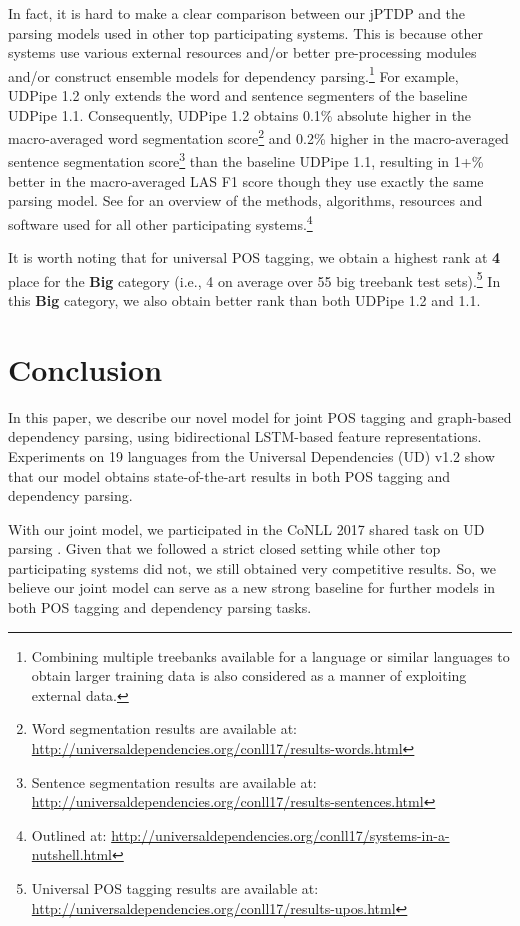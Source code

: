 \documentclass[11pt,letterpaper]{article}
\begin{document}
In fact, it is hard to make a clear comparison between our jPTDP and the parsing models used in other top participating systems. This is because other systems use various external resources and/or better pre-processing modules and/or construct ensemble models for dependency parsing.\footnote{Combining multiple treebanks available for a language or similar languages to obtain larger training data is also considered as a manner of exploiting external data.} For example, UDPipe 1.2 only extends  the word and sentence segmenters of the baseline UDPipe 1.1. Consequently,  UDPipe 1.2 obtains 0.1\% absolute higher in  the macro-averaged word segmentation score\footnote{Word segmentation results are available at: \\ \url{http://universaldependencies.org/conll17/results-words.html}} and 0.2\% higher in the macro-averaged sentence segmentation score\footnote{Sentence segmentation results are available at: \\  \url{http://universaldependencies.org/conll17/results-sentences.html}} than the baseline UDPipe 1.1, resulting in 1+\% better in the macro-averaged LAS F1 score though they use exactly the same parsing model. 
See \citet{udst:overview} for an overview of the methods, algorithms, resources and software used for all other participating systems.\footnote{Outlined at:  \url{http://universaldependencies.org/conll17/systems-in-a-nutshell.html}} 

It is worth noting that for  universal POS tagging, we obtain a highest rank at \textbf{4} place for the \textbf{Big} category (i.e., {4} on average over 55 big treebank test sets).\footnote{Universal POS tagging results are available at:\\ \url{http://universaldependencies.org/conll17/results-upos.html}}  In this \textbf{Big} category, we also obtain better rank  than both   UDPipe 1.2 and 1.1. 


\section{Conclusion}

In this paper, we describe our novel model  for joint POS tagging and graph-based dependency parsing, using bidirectional LSTM-based feature representations. Experiments on 19 languages from the Universal Dependencies (UD) v1.2 show that our model obtains state-of-the-art results in both POS tagging and dependency parsing. 

With our joint model, we  participated in the CoNLL 2017 shared task on UD parsing \citep{udst:overview}.  Given that we followed a strict closed setting while other top participating systems did not,  we still obtained  very competitive results. So, we believe  our joint model can serve as a new strong baseline for further models in both POS tagging and dependency parsing tasks.  
\end{document}
